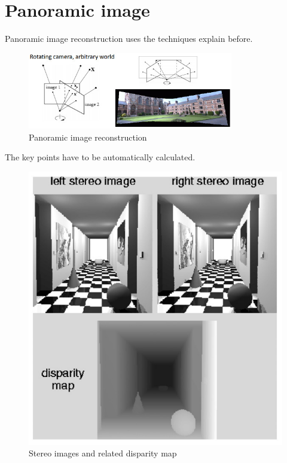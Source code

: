 \section{Panoramic image}

\begin{frame}{\secname}
    Panoramic image reconstruction uses the techniques explain before.
    \begin{figure}
        \centering
        \includegraphics[width=0.8\textwidth]{img/homography_transformation_example3}
        \caption{Panoramic image reconstruction \cite{noauthor_opencv_nodate}}
    \end{figure}
\end{frame}

\begin{frame}{\secname}
    The key points have to be automatically calculated.
    \begin{figure}
        \centering
        \includegraphics[width=0.5\textheight]{img/pano_make}
        \caption{Stereo images and related disparity map \cite{gledhill_panoramic_2003}}
    \end{figure}
\end{frame}

